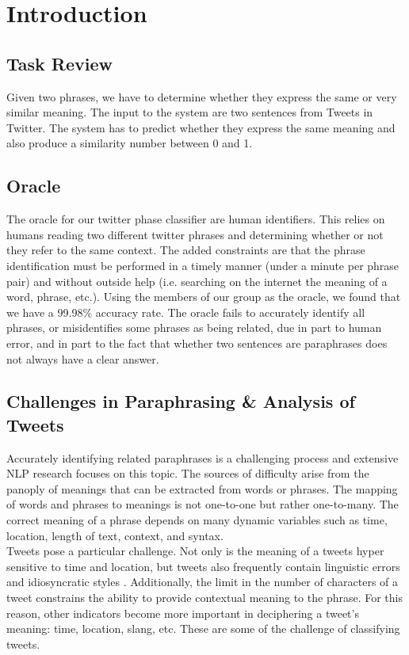 \documentclass[conference]{IEEEtran}
\begin{document}
\section{Introduction}
\subsection{Task Review}
Given two phrases, we have to determine whether they express the same or very similar meaning. The input to the system are two sentences from Tweets in Twitter. The system has to predict whether they express the same meaning and also produce a similarity number between 0 and 1.\\

\subsection{Oracle}
The oracle for our twitter phase classifier are human identifiers. This relies on humans reading two different twitter phrases and determining whether or not they refer to the same context. The added constraints are that the phrase identification must be performed in a timely manner (under a minute per phrase pair) and without outside help (i.e. searching on the internet the meaning of a word, phrase, etc.). Using the members of our group as the oracle, we found that we have a 99.98\% accuracy rate. The oracle fails to accurately identify all phrases, or misidentifies some phrases as being related, due in part to human error, and in part to the fact that whether two sentences are paraphrases does not always have a clear answer. \\

\subsection{Challenges in Paraphrasing \& Analysis of Tweets}
Accurately identifying related paraphrases is a challenging process and extensive NLP research focuses on this topic. The sources of difficulty arise from the panoply of meanings that can be extracted from words or phrases. The mapping of words and phrases to meanings is not one-to-one but rather one-to-many. The correct meaning of a phrase depends on many dynamic variables such as time, location, length of text, context, and syntax. \\

Tweets pose a particular challenge. Not only is the meaning of a tweets hyper sensitive to time and location, but tweets also frequently contain linguistic errors and idiosyncratic styles \cite{derczynski}. Additionally, the limit in the number of characters of a tweet constrains the ability to provide contextual meaning to the phrase. For this reason, other indicators become more important in deciphering a tweet's meaning: time, location, slang, etc. These are some of the challenge of classifying tweets. \\
\end{document}
